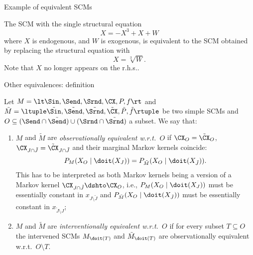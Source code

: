 \begin{frame}{Example of equivalent SCMs}
\begin{example}
  The SCM with the single structural equation
  $$X = -X^3 + X + W$$
  where $X$ is endogenous, and $W$ is exogenous, is equivalent to the SCM obtained by replacing the structural equation with
  $$X = \sqrt[3]{W}.$$
  Note that $X$ no longer appears on the r.h.s..
\end{example}
\end{frame}

\begin{frame}{Other equivalences: definition}
\begin{definition}
  Let $M = \lt \Sin, \Send, \Srnd, \CX, P, f \rt$ and
  $\tilde{M} = \ltuple \tilde{\Sin}, \tilde{\Send}, \tilde{\Srnd}, \tilde{\CX}, \tilde{P}, \tilde{f} \rtuple$ be two simple SCMs
  and $O \subseteq (\Send \cap \tilde{\Send}) \cup (\Srnd \cap \tilde{\Srnd})$ a subset.
  We say that:
  \begin{enumerate}
    \item $M$ and $\tilde{M}$ are \emph{observationally equivalent w.r.t.\ $O$} if $\CX_O = \tilde{\CX}_O$, $\CX_{J \cap \tilde{J}} = \tilde{\CX}_{J \cap \tilde{J}}$ and their marginal Markov kernels coincide:
      $$P_{M}(X_O \mid \doit(X_J)) = P_{\tilde{M}}(X_O \mid \doit(X_{\tilde J})).$$
    This has to be interpreted as both Markov kernels being a version of a Markov kernel $\CX_{J \cap \tilde{J}} \dshto \CX_O$,
    i.e., $P_{M}(X_O \mid \doit(X_J))$ must be essentially constant in $x_{J \setminus \tilde{J}}$ and
    $P_{\tilde{M}}(X_O \mid \doit(X_{\tilde{J}}))$ must be essentially constant in $x_{\tilde{J} \setminus J}$;
    \item $M$ and $\tilde{M}$ are \emph{interventionally equivalent w.r.t.\ $O$} if for every subset $T \subseteq O$ the intervened SCMs $M_{\doit(T)}$ and $\tilde{M}_{\doit(T)}$ are observationally equivalent w.r.t.\ $O \setminus T$.
  \end{enumerate}
\end{definition}
\end{frame}

